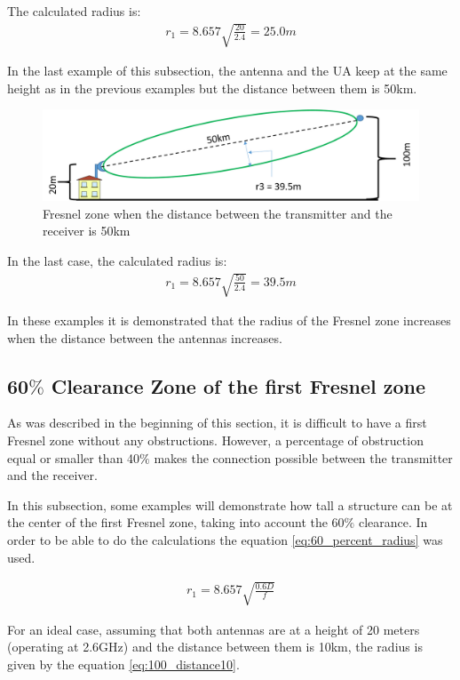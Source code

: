 The calculated radius is:
\begin{align*}
r_1 = 8.657 \sqrt{\frac{20}{2.4}} = 25.0m
\end{align*}

In the last example of this subsection, the antenna and the UA keep at the same height as in the previous examples but the distance between them is 50km.

\begin{figure}[H]
	\centering
	\includegraphics[scale=0.50]{figures/fresnel_50km.png}
	\caption{Fresnel zone when the distance between the transmitter and the receiver is 50km}
	\label{fig:fresnel_zones_50km}
\end{figure}  

In the last case, the calculated radius is:
\begin{align*}
r_1 = 8.657\sqrt{\frac{50}{2.4}} = 39.5m
\end{align*}

In these examples it is demonstrated that the radius of the Fresnel zone increases when the distance between the antennas increases.

\subsection{60$\%$ Clearance Zone of the first Fresnel zone}
As was described in the beginning of this section, it is difficult to have a first Fresnel zone without any obstructions. However, a percentage of obstruction equal or smaller than 40$\%$ makes the connection possible between the transmitter and the receiver.

In this subsection, some examples will demonstrate how tall a structure can be at the center of the first Fresnel zone, taking into account the 60$\%$ clearance. In order to be able to do the calculations the equation \ref{eq:60_percent_radius} was used.

\begin{align}
r_1 = 8.657\sqrt{\frac{0.6D}{f}}\label{eq:60_percent_radius}
\end{align}

For an ideal case, assuming that both antennas are at a height of 20 meters (operating at 2.6GHz) and the distance between them is 10km, the radius is given by the equation \ref{eq:100_distance10}.

